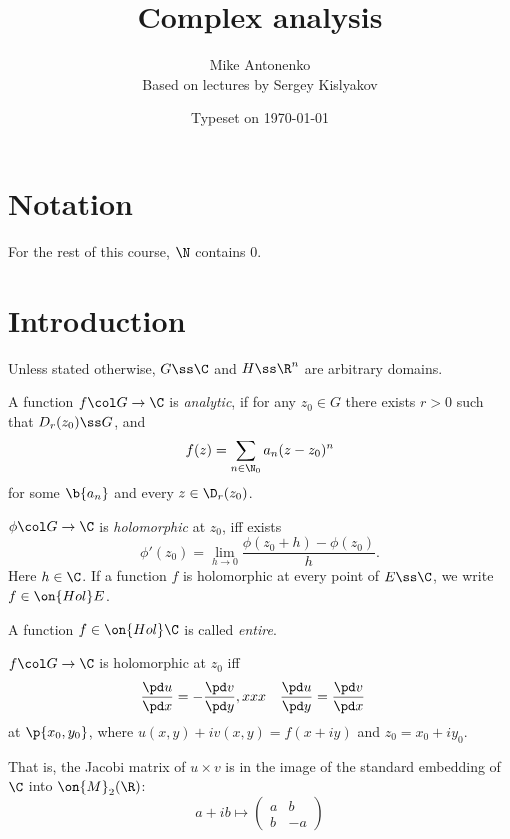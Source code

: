 \documentclass[a4paper, 12pt]{article}
\title{Complex analysis}
\author{Mike Antonenko \\ Based on lectures by Sergey Kislyakov}
\date{Typeset on \today}
\newcommand{\Hol}[0]{\on{Hol}}
\begin{document}
\maketitle

\section{Notation}

For the rest of this course, $\N$ contains 0.

\section{Introduction}

\begin{definition}
  Unless stated otherwise, $G \ss \C$ and $H \ss \R^n$ are arbitrary domains.
\end{definition}

\begin{definition}
  A function $f \col G \to \C$ is \emph{analytic}, if for any $z_0 \in G$ there exists $r > 0$ such that $D_r(z_0) \ss G$, and
  $$ f(z) = \sum_{n \in \N_0} a_n (z - z_0)^n $$
  for some $\b{a_n}$ and every $z \in \D_r(z_0)$. 
\end{definition}

\begin{definition}
  $\phi \col G \to \C$ is \emph{holomorphic} at $z_0$, iff exists
  $$ \phi'(z_0) = \lim_{h \to 0} \frac{\phi(z_0+h)-\phi(z_0)}{h}. $$
  Here $h \in \C$.
  If a function $f$ is holomorphic at every point of $E \ss \C$, we write $f \in \Hol E$.
\end{definition}

\begin{definition}
  A function $f \in \Hol \C$ is called \emph{entire}.
\end{definition}

\begin{theorem}
  $f \col G \to \C$ is holomorphic at $z_0$ iff
  \begin{align*}
    \frac{\pd u}{\pd x} &= -\frac{\pd v}{\pd y}, x  x x&
    \frac{\pd u}{\pd y} &= \frac{\pd v}{\pd x}
  \end{align*}
  at $\p{x_0, y_0}$,
  where $u(x, y)+iv(x,y) = f(x+iy)$ and $z_0 = x_0+iy_0$.
\end{theorem}
That is, the Jacobi matrix of $u \times v$ is in the image of the standard embedding of $\C$ into $\on{M}_2(\R)$:
$$ a+ib \mapsto \begin{pmatrix}
  a & b \\
  b & -a
\end{pmatrix}
$$
\end{document}
